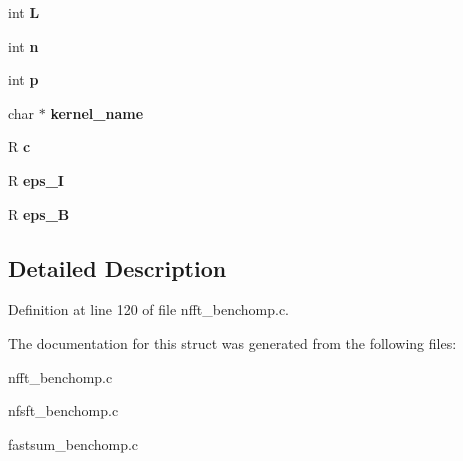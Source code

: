 \begin{DoxyCompactItemize}
\item 
\hypertarget{structs__param_a467a593d75c1526916c37747db8ec234}{int {\bfseries L}}\label{structs__param_a467a593d75c1526916c37747db8ec234}

\item 
\hypertarget{structs__param_ace7c761113b9019b7b8fc5fea042b713}{int {\bfseries n}}\label{structs__param_ace7c761113b9019b7b8fc5fea042b713}

\item 
\hypertarget{structs__param_aef18bbac08d37dbab0b2cd464ad3bad0}{int {\bfseries p}}\label{structs__param_aef18bbac08d37dbab0b2cd464ad3bad0}

\item 
\hypertarget{structs__param_a55b49785531ca10cee68118598cba53a}{char $\ast$ {\bfseries kernel\-\_\-name}}\label{structs__param_a55b49785531ca10cee68118598cba53a}

\item 
\hypertarget{structs__param_a1a261e0fa2c22c6b6a6e8015a36cd005}{R {\bfseries c}}\label{structs__param_a1a261e0fa2c22c6b6a6e8015a36cd005}

\item 
\hypertarget{structs__param_ad016e56ffe6bbb473d0a1d6b4270459f}{R {\bfseries eps\-\_\-\-I}}\label{structs__param_ad016e56ffe6bbb473d0a1d6b4270459f}

\item 
\hypertarget{structs__param_a7a693f5233862b55930e9b904f31d79b}{R {\bfseries eps\-\_\-\-B}}\label{structs__param_a7a693f5233862b55930e9b904f31d79b}

\end{DoxyCompactItemize}


\subsection{Detailed Description}


Definition at line 120 of file nfft\-\_\-benchomp.\-c.



The documentation for this struct was generated from the following files\-:\begin{DoxyCompactItemize}
\item 
nfft\-\_\-benchomp.\-c\item 
nfsft\-\_\-benchomp.\-c\item 
fastsum\-\_\-benchomp.\-c\end{DoxyCompactItemize}
